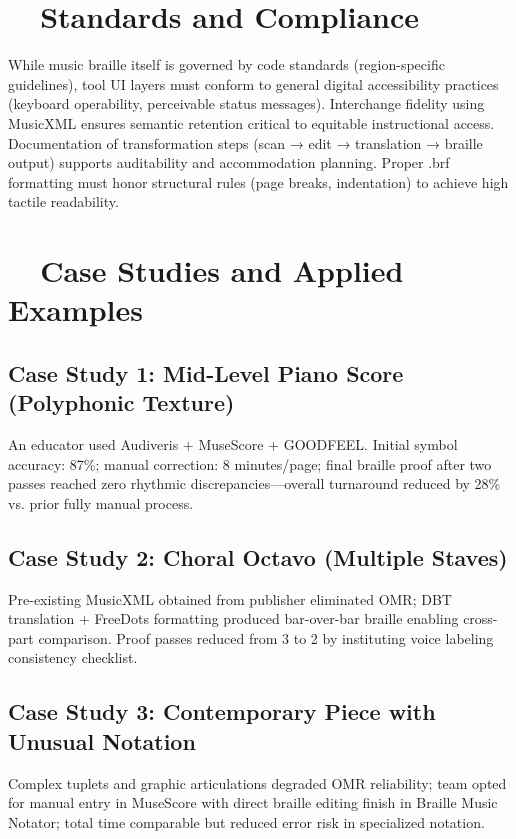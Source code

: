 \section{~~Standards and Compliance}\label{ch10:sec:standards-compliance}
While music braille itself is governed by code standards (region-specific guidelines), tool UI layers must conform to general digital accessibility practices (keyboard operability, perceivable status messages). Interchange fidelity using \gls{MusicXML} ensures semantic retention critical to equitable instructional access.\supercite{daisy-musicxml} Documentation of transformation steps (scan → edit → translation → braille output) supports auditability and accommodation planning. Proper .brf formatting must honor structural rules (page breaks, indentation) to achieve high tactile readability.\supercite{BRLFormat}

\section{~~Case Studies and Applied Examples}\label{ch10:sec:case-studies}
\subsection{Case Study 1: Mid-Level Piano Score (Polyphonic Texture)}
An educator used Audiveris + MuseScore + GOODFEEL. Initial symbol accuracy: 87\%; manual correction: 8 minutes/page; final braille proof after two passes reached zero rhythmic discrepancies—overall turnaround reduced by 28\% vs. prior fully manual process.\supercite{researchgate-polyphonic-omr, dancingdots-goodfeel}

\subsection{Case Study 2: Choral Octavo (Multiple Staves)}
Pre-existing \gls{MusicXML} obtained from publisher eliminated \gls{OMR}; DBT translation + FreeDots formatting produced bar-over-bar braille enabling cross-part comparison. Proof passes reduced from 3 to 2 by instituting voice labeling consistency checklist.\supercite{DuxburyDBT, blindguru-freedots}

\subsection{Case Study 3: Contemporary Piece with Unusual Notation}
Complex tuplets and graphic articulations degraded \gls{OMR} reliability; team opted for manual entry in MuseScore with direct braille editing finish in Braille Music Notator; total time comparable but reduced error risk in specialized notation.\supercite{musescore-accessibility, braillemusicnotator}

